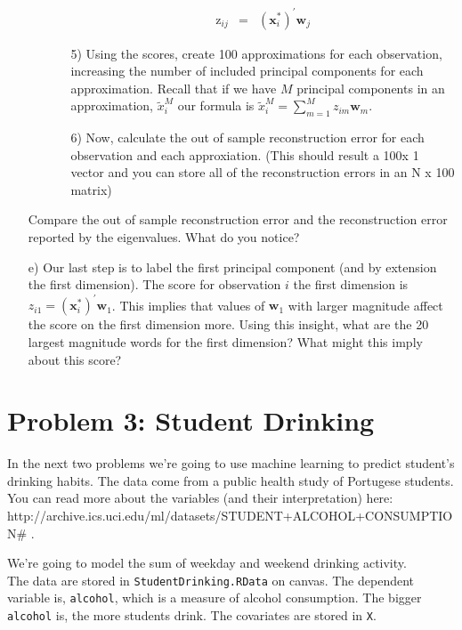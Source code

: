 \documentclass[letterpaper,12pt]{article}
\numberwithin{equation}{section}
\numberwithin{equation}{section}
\begin{document}
\begin{itemize}
\begin{itemize}
\begin{itemize}
\begin{eqnarray}
\text{z}_{ij} &= & (\boldsymbol{x}_{i}^{*})^{'}\boldsymbol{w}_{j} \nonumber 
\end{eqnarray} 
\item[5)] Using the scores, create 100 approximations for each observation, increasing the number of included principal components for each approximation.  Recall that if we have $M$ principal components in an approximation, $\tilde{x}_{i}^{M}$ our formula is $\tilde{x}_{i}^{M} = \sum_{m=1}^{M} z_{im} \boldsymbol{w}_{m}$.  
\item[6)] Now, calculate the out of sample reconstruction error for each observation and each approxiation.  (This should result a 100x 1 vector and you can store all of the reconstruction errors in an N x 100 matrix)
\end{itemize}
\end{itemize}
Compare the out of sample reconstruction error and the reconstruction error reported by the eigenvalues.  What do you notice?
\item[e)] Our last step is to label the first principal component (and by extension the first dimension).  The score for observation $i$ the first dimension is $z_{i1} = (\boldsymbol{x}_{i}^{*})^{'}\boldsymbol{w}_{1}$.  This implies that values of $\boldsymbol{w}_{1}$ with larger magnitude affect the score on the first dimension more.  Using this insight, what are the 20 largest magnitude words for the first dimension?  What might this imply about this score?  
\end{itemize}


\section{Problem 3: Student Drinking}


\noindent In the next two problems we're going to use machine learning to predict student's drinking habits.  The data come from a public health study of Portugese students.  You can read more about the variables (and their interpretation) here: \\

http://archive.ics.uci.edu/ml/datasets/STUDENT+ALCOHOL+CONSUMPTION\# . 

\noindent We're going to model the sum of weekday and weekend drinking activity.    \\

\noindent The data are stored in {\tt StudentDrinking.RData} on canvas.  The dependent variable is, {\tt alcohol}, which is a measure of alcohol consumption.  The bigger {\tt alcohol} is, the more students drink.  The covariates are stored in {\tt X}.  
\end{document}
